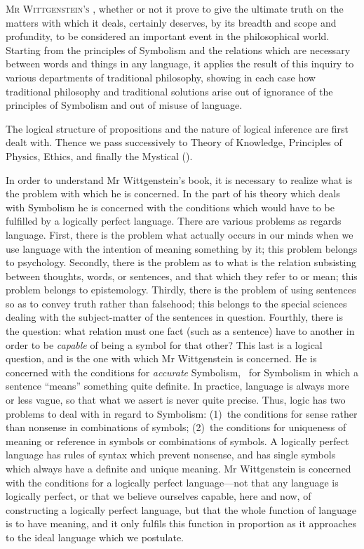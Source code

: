 \textsc{Mr Wittgenstein's} , whether
or not it prove to give the ultimate truth on the matters
with which it deals, certainly deserves, by its breadth and
scope and profundity, to be considered an important event
in the philosophical world. Starting from the principles
of Symbolism and the relations which are necessary
between words and things in any language, it applies
the result of this inquiry to various departments of traditional
philosophy, showing in each case how traditional
philosophy and traditional solutions arise out of ignorance
of the principles of Symbolism and out of misuse of
language.

The logical structure of propositions and the nature
of logical inference are first dealt with. Thence we pass
successively to Theory of Knowledge, Principles of Physics,
Ethics, and finally the Mystical ().

In order to understand Mr Wittgenstein's book, it is
necessary to realize what is the problem with which he is
concerned. In the part of his theory which deals with
Symbolism he is concerned with the conditions which
would have to be fulfilled by a logically perfect language.
There are various problems as regards language. First,
there is the problem what actually occurs in our minds
when we use language with the intention of meaning
something by it; this problem belongs to psychology.
Secondly, there is the problem as to what is the relation
subsisting between thoughts, words, or sentences, and that
which they refer to or mean; this problem belongs to
epistemology. Thirdly, there is the problem of using
sentences so as to convey truth rather than falsehood;
this belongs to the special sciences dealing with the
subject-matter of the sentences in question. Fourthly,
there is the question: what relation must one fact (such
as a sentence) have to another in order to be \emph{capable}
of being a symbol for that other? This last is a logical
question, and is the one with which Mr Wittgenstein is
concerned. He is concerned with the conditions for \emph{accurate}
Symbolism, \idEst\ for Symbolism in which a sentence
``means'' something quite definite. In practice, language
is always more or less vague, so that what we assert is
never quite precise. Thus, logic has two problems to deal
with in regard to Symbolism: (1)~the conditions for sense
rather than nonsense in combinations of symbols; (2)~the
conditions for uniqueness of meaning or reference in
symbols or combinations of symbols. A logically perfect
language has rules of syntax which prevent nonsense, and
has single symbols which always have a definite and
unique meaning. Mr Wittgenstein is concerned with the
conditions for a logically perfect language---not that any
language is logically perfect, or that we believe ourselves
capable, here and now, of constructing a logically perfect
language, but that the whole function of language is to
have meaning, and it only fulfils this function in proportion
as it approaches to the ideal language which we
postulate.

